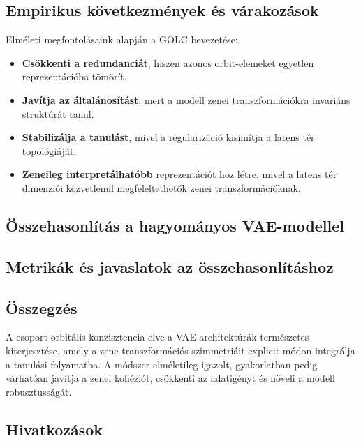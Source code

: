 \subsection{Empirikus következmények és várakozások}

Elméleti megfontolásaink alapján a GOLC bevezetése:

\begin{itemize}
    \item \textbf{Csökkenti a redundanciát}, hiszen azonos orbit-elemeket egyetlen reprezentációba tömörít.
    \item \textbf{Javítja az általánosítást}, mert a modell zenei transzformációkra invariáns struktúrát tanul.
    \item \textbf{Stabilizálja a tanulást}, mivel a regularizáció kisimítja a latens tér topológiáját.
    \item \textbf{Zeneileg interpretálhatóbb} reprezentációt hoz létre, mivel a latens tér dimenziói közvetlenül megfeleltethetők zenei transzformációknak.
\end{itemize}

\subsection{Összehasonlítás a hagyományos VAE-modellel}


\subsection{Metrikák és javaslatok az összehasonlításhoz}


\subsection{Összegzés}

A csoport-orbitális konzisztencia elve a VAE-architektúrák természetes kiterjesztése, amely a zene transzformációs szimmetriáit explicit módon integrálja a tanulási folyamatba.  
A módszer elméletileg igazolt, gyakorlatban pedig várhatóan javítja a zenei kohéziót, csökkenti az adatigényt és növeli a modell robusztusságát.

\subsection{Hivatkozások}



